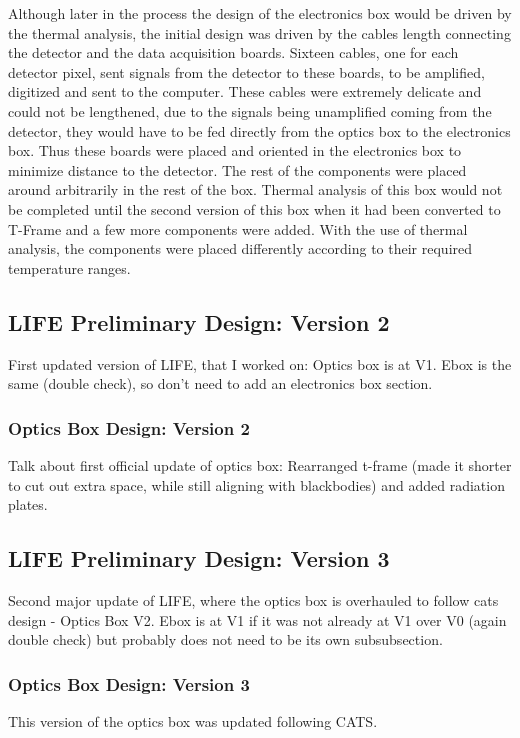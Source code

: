 Although later in the process the design of the electronics box would be driven by the thermal analysis, the initial design was driven by the cables length connecting the detector and the data acquisition boards. Sixteen cables, one for each detector pixel, sent signals from the detector to these boards, to be amplified, digitized and sent to the computer. These cables were extremely delicate and could not be lengthened, due to the signals being unamplified coming from the detector, they would have to be fed directly from the optics box to the electronics box. Thus these boards were placed and oriented in the electronics box to minimize distance to the detector. The rest of the components were placed around arbitrarily in the rest of the box. Thermal analysis of this box would not be completed until the second version of this box when it had been converted to T-Frame and a few more components were added. With the use of thermal analysis, the components were placed differently according to their required temperature ranges.

\subsection{LIFE Preliminary Design: Version 2}
First updated version of LIFE, that I worked on: Optics box is at V1. Ebox is the same (double check), so don't need to add an electronics box section.

\subsubsection{Optics Box Design: Version 2}
Talk about first official update of optics box: Rearranged t-frame (made it shorter to cut out extra space, while still aligning with blackbodies) and added radiation plates.

\subsection{LIFE Preliminary Design: Version 3}
Second major update of LIFE, where the optics box is overhauled to follow cats design - Optics Box V2. Ebox is at V1 if it was not already at V1 over V0 (again double check) but probably does not need to be its own subsubsection.

\subsubsection{Optics Box Design: Version 3}
This version of the optics box was updated following CATS.

